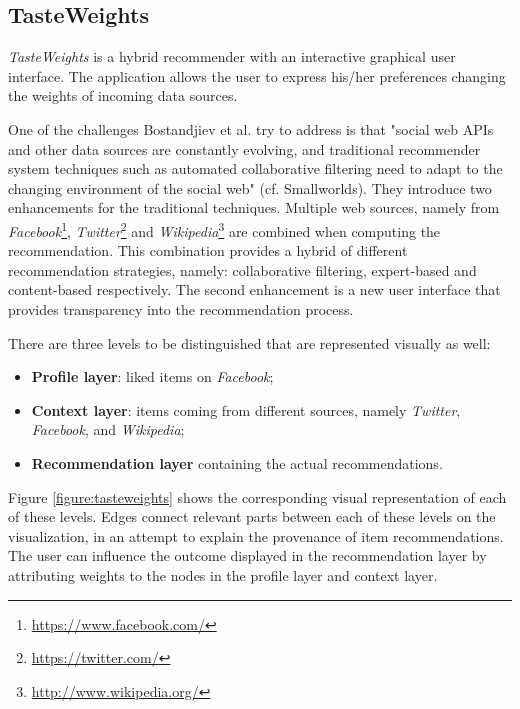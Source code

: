 \subsection{TasteWeights}\label{chapter:survey:section:applications:subsection:tasteweights}

\emph{TasteWeights} is a hybrid recommender with an interactive graphical user interface\cite{bostandjiev:2012}. The application allows the user to express his/her preferences changing the weights of incoming data sources.

One of the challenges Bostandjiev et al. try to address is that "social web APIs and other data sources are constantly evolving, and traditional recommender system techniques such as automated collaborative filtering need to adapt to the changing environment of the social web"\cite{bostandjiev:2012} (cf. Smallworlds). They introduce two enhancements for the traditional techniques. Multiple web sources, namely from \emph{Facebook}\footnote{\url{https://www.facebook.com/}}, \emph{Twitter}\footnote{\url{https://twitter.com/}} and \emph{Wikipedia}\footnote{\url{http://www.wikipedia.org/}} are combined when computing the recommendation. This combination provides a hybrid of different recommendation strategies, namely: collaborative filtering, expert-based and content-based respectively. The second enhancement is a new user interface that provides transparency into the recommendation process.

There are three levels to be distinguished that are represented visually as well:

\begin{itemize}
	\item \textbf{Profile layer}: liked items on \emph{Facebook};
	\item \textbf{Context layer}: items coming from different sources, namely \emph{Twitter}, \emph{Facebook}, and \emph{Wikipedia};
	\item \textbf{Recommendation layer} containing the actual recommendations.
\end{itemize}

Figure \ref{figure:tasteweights} shows the corresponding visual representation of each of these levels. Edges connect relevant parts between each of these levels on the visualization, in an attempt to explain the provenance of item recommendations. The user can influence the outcome displayed in the recommendation layer by attributing weights to the nodes in the profile layer and context layer\cite{bostandjiev:2012}.

